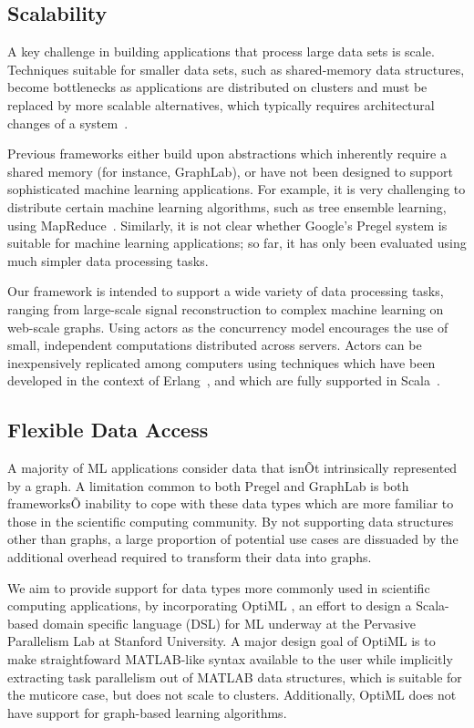 \documentclass[acmtocl]{acmtrans2m}
\begin{document}
\subsection{Scalability}

A key challenge in building applications that process large data sets is scale. Techniques suitable for smaller data sets, such as shared-memory data structures, become bottlenecks as applications are distributed on clusters and must be replaced by more scalable alternatives, which typically requires architectural changes of a system~\cite{DeCandia07}.

Previous frameworks either build upon abstractions which inherently require a shared memory (for instance, GraphLab), or have not been designed to support sophisticated machine learning applications. For example, it is very challenging to distribute certain machine learning algorithms, such as tree ensemble learning, using MapReduce~\cite{PandaHBB09}. Similarly, it is not clear whether Google's Pregel system is suitable for machine learning applications; so far, it has only been evaluated using much simpler data processing tasks.

Our framework is intended to support a wide variety of data processing tasks, ranging from large-scale signal reconstruction to complex machine learning on web-scale graphs. Using actors as the concurrency model encourages the use of small, independent computations distributed across servers. Actors can be inexpensively replicated among computers using techniques which have been developed in the context of Erlang~\cite{erlang-book}, and which are fully supported in Scala~\cite{HallerO09}.

\subsection{Flexible Data Access}
A majority of ML applications consider data that isnÕt intrinsically represented by a graph. A limitation common to both Pregel and GraphLab is both frameworksÕ inability to cope with these data types which are more familiar to those in the scientific computing community. By not supporting data structures other than graphs, a large proportion of potential use cases are dissuaded by the additional overhead required to transform their data into graphs.

We aim to provide support for data types more commonly used in scientific computing applications, by incorporating OptiML \cite{Chafi11}, an effort to design a Scala-based domain specific language (DSL) for ML underway at the Pervasive Parallelism Lab at Stanford University. A major design goal of OptiML is to make straightfoward MATLAB-like syntax available to the user while implicitly extracting task parallelism out of MATLAB data structures, which is suitable for the muticore case, but does not scale to clusters. Additionally, OptiML does not have support for graph-based learning algorithms.
\end{document}
